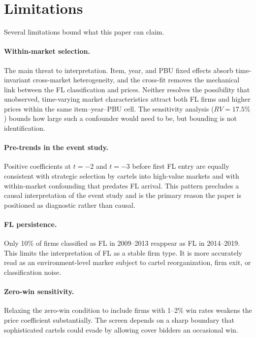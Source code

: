 
\section{Limitations}
\label{sec:limitations}

Several limitations bound what this paper can claim.

\paragraph{Within-market selection.}
The main threat to interpretation. Item, year, and PBU fixed effects
absorb time-invariant cross-market heterogeneity, and the cross-fit
removes the mechanical link between the FL classification and prices.
Neither resolves the possibility that unobserved, time-varying market
characteristics attract both FL firms and higher prices within the
same item--year--PBU cell. The sensitivity analysis ($RV = 17.5\%$)
bounds how large such a confounder would need to be, but bounding is
not identification.

\paragraph{Pre-trends in the event study.}
Positive coefficients at $t = -2$ and $t = -3$ before first FL entry
are equally consistent with strategic selection by cartels into
high-value markets and with within-market confounding that predates
FL arrival. This pattern precludes a causal interpretation of the
event study and is the primary reason the paper is positioned as
diagnostic rather than causal.

\paragraph{FL persistence.}
Only 10\% of firms classified as FL in 2009--2013 reappear as FL in
2014--2019. This limits the interpretation of FL as a stable firm
type. It is more accurately read as an environment-level marker
subject to cartel reorganization, firm exit, or classification noise.

\paragraph{Zero-win sensitivity.}
Relaxing the zero-win condition to include firms with 1--2\% win
rates weakens the price coefficient substantially. The screen depends
on a sharp boundary that sophisticated cartels could evade by allowing
cover bidders an occasional win.

